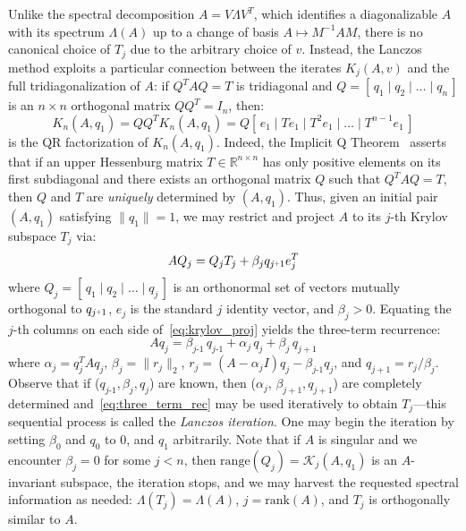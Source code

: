 \documentclass[10pt]{article}
\newcommand{\+}{%
	\raisebox{0.18ex}{\scaleobj{0.55}{+}}
}
\theoremstyle{definition}
\begin{document}
Unlike the spectral decomposition $A = V \Lambda V^T$, which identifies a diagonalizable $A$ with its spectrum $\Lambda(A)$ up to a change of basis $A \mapsto M^{-1} A M$, there is no canonical choice of $T_j$ due to the arbitrary choice of $v$. 
Instead, the Lanczos method exploits a particular connection between the iterates $K_j(A,v)$ and the full tridiagonalization of $A$: if $Q^T A Q = T$ is tridiagonal and $Q= [\, q_1 \mid q_2 \mid \dots \mid q_n \,]$ is an $n \times n$ orthogonal matrix $Q Q^T = I_n$, then:
\begin{equation}
	K_n(A, q_1) = Q Q^T K_n(A, q_1) = Q[ \, e_1 \mid T e_1 \mid T^2 e_1 \mid \dots \mid T^{n-1} e_1 \, ]
\end{equation}
is the QR factorization of $K_n(A, q_1)$.
Indeed, the Implicit Q Theorem~\cite{golub2013matrix} asserts that if an upper Hessenburg matrix $T \in \mathbb{R}^{n \times n}$ has only positive elements on its first subdiagonal and there exists an orthogonal matrix $Q$ such that $Q^T A Q = T$, then $Q$ and $T$ are \emph{uniquely} determined by $(A, q_1)$. 
Thus, given an initial pair $(A, q_1)$ satisfying $\lVert q_1 \rVert = 1$, we may restrict and project $A$ to its $j$-th Krylov subspace $T_j$ via: 
\begin{equation}\label{eq:krylov_proj}
	A Q_j = Q_j T_j + \beta_j q_{j\+1} e_{j}^T
\end{equation}
where $Q_j = [\, q_1 \mid q_2 \mid \dots \mid q_j \,]$ is an orthonormal set of vectors mutually orthogonal to $q_{j\+1}$, 
$e_{j}$ is the standard $j$ identity vector, and $\beta_j > 0$.
Equating the $j$-th columns on each side of~\eqref{eq:krylov_proj} yields the three-term recurrence: 
\begin{equation}\label{eq:three_term_rec}
	A q_j = \beta_{j\text{-}1} \, q_{j\text{-}1} + \alpha_j \, q_j + \beta_{j} \, q_{j+1}
\end{equation}
where $\alpha_j = q_j^T A q_j$, $\beta_j = \lVert r_j \rVert_2$, $r_j = (A - \alpha_j I)q_j - \beta_{j\text{-}1} q_j$, and $q_{j+1} = r_j / \beta_j$. Observe that if ($q_{j\text{-}1}, \beta_j, q_j$) are known, then ($\alpha_j$, $\beta_{j+1}, q_{j+1}$) are completely determined and~\eqref{eq:three_term_rec} may be used iteratively to obtain $T_j$---this sequential process is called the \emph{Lanczos iteration}. One may begin the iteration by setting $\beta_0$ and $q_0$ to $0$, and $q_1$ arbitrarily. Note that if $A$ is singular and we encounter $\beta_j = 0$ for some $j < n$, then $\mathrm{range}(Q_j) = \mathcal{K}_j(A, q_1)$ is an $A$-invariant subspace, the iteration stops, and we may harvest the requested spectral information as needed: $\Lambda(T_j) = \Lambda(A)$, $j = \mathrm{rank}(A)$, and $T_j$ is orthogonally similar to $A$. 
\end{document}
